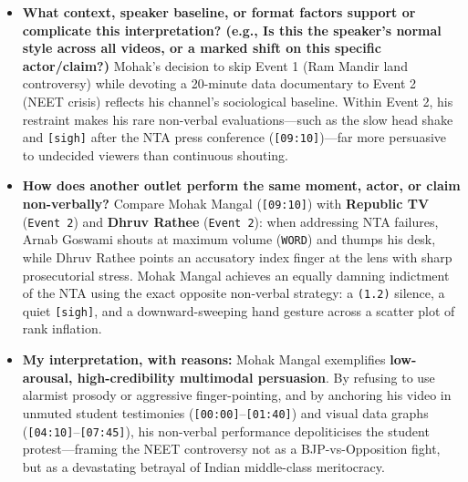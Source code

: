\documentclass[10pt,a4paper]{article}
\begin{document}
\begin{itemize}
His non-verbal cues \textbf{reinforce and visualise} complex statistical arguments (hand trajectories matching rank-inflation curves), \textbf{soften and humanise} policy analysis through quiet vocal drops \texttt{$^\circ$...$^\circ$}, and \textbf{gently invert bureaucratic jargon} via a weary \texttt{[sigh]} and dry \texttt{[chuckle]} when the NTA claims "complete transparency" (\texttt{[09:10]}).\par\smallskip
  \item \textbf{What context, speaker baseline, or format factors support or complicate this interpretation? (e.g., Is this the speaker's normal style across all videos, or a marked shift on this specific actor/claim?)}
Mohak's decision to skip Event 1 (Ram Mandir land controversy) while devoting a 20-minute data documentary to Event 2 (NEET crisis) reflects his channel's sociological baseline. Within Event 2, his restraint makes his rare non-verbal evaluations---such as the slow head shake and \texttt{[sigh]} after the NTA press conference (\texttt{[09:10]})---far more persuasive to undecided viewers than continuous shouting.\par\smallskip
  \item \textbf{How does another outlet perform the same moment, actor, or claim non-verbally?}
Compare Mohak Mangal (\texttt{[09:10]}) with \textbf{Republic TV} (\texttt{Event 2}) and \textbf{Dhruv Rathee} (\texttt{Event 2}): when addressing NTA failures, Arnab Goswami shouts at maximum volume (\texttt{WORD}) and thumps his desk, while Dhruv Rathee points an accusatory index finger at the lens with sharp prosecutorial stress. Mohak Mangal achieves an equally damning indictment of the NTA using the exact opposite non-verbal strategy: a \texttt{(1.2)} silence, a quiet \texttt{[sigh]}, and a downward-sweeping hand gesture across a scatter plot of rank inflation.\par\smallskip
  \item \textbf{My interpretation, with reasons:}
Mohak Mangal exemplifies \textbf{low-arousal, high-credibility multimodal persuasion}. By refusing to use alarmist prosody or aggressive finger-pointing, and by anchoring his video in unmuted student testimonies (\texttt{[00:00]}--\texttt{[01:40]}) and visual data graphs (\texttt{[04:10]}--\texttt{[07:45]}), his non-verbal performance depoliticises the student protest---framing the NEET controversy not as a BJP-vs-Opposition fight, but as a devastating betrayal of Indian middle-class meritocracy.\par\smallskip
\end{itemize}
\end{document}
